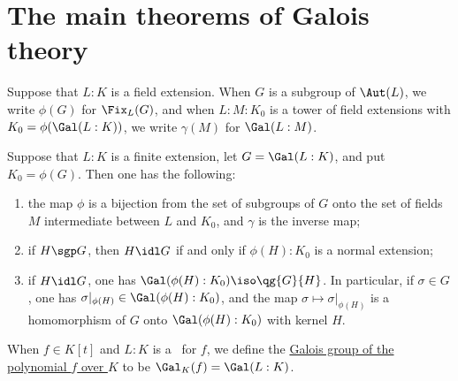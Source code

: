 \documentclass{article}
\begin{document}
\section{The main theorems of Galois theory}
  \begin{tdefinition}
    Suppose that \( L:K \) is a field extension.
    When \( G \) is a subgroup of \( \Aut(L) \), we write \( \phi(G) \) for \( \Fix_L(G) \), and when \( L:M:K_0 \) is a tower of field extensions with \( K_0=\phi(\Gal(L:K)) \), we write \( \gamma(M) \) for \( \Gal(L:M) \).
  \end{tdefinition}

  \begin{ttheorem}
    Suppose that \( L:K \) is a finite extension, let \( G=\Gal(L:K) \), and put \( K_0=\phi(G) \).
    Then one has the following: \begin{enumerate}[label=(\alph*)]
      \item the map \( \phi \) is a bijection from the set of subgroups of \( G \) onto the set of fields \( M \) intermediate between \( L \) and \( K_0 \), and \( \gamma \) is the inverse map;
      \item if \( H \sgp G \), then \( H\idl G \) if and only if \( \phi(H):K_0 \) is a normal extension;
      \item if \( H\idl G \), one has \( \Gal(\phi(H):K_0) \iso \qg{G}{H} \).
        In particular, if \( \sigma\in G \), one has \( \sigma|_{\phi(H)} \in \Gal(\phi(H):K_0) \), and the map \( \sigma\mapsto\sigma|_{\phi(H)} \) is a homomorphism of \( G \) onto \( \Gal(\phi(H):K_0) \) with kernel \( H \).
    \end{enumerate}
  \end{ttheorem}

  \begin{tdefinition}
    When \( f\in K[t] \) and \( L:K \) is a \sfe~for \( f \), we define the \ul{Galois group of the polynomial \( f \) over \( K \)} to be \( \Gal_K(f) = \Gal(L:K) \).
  \end{tdefinition}

\end{document}
